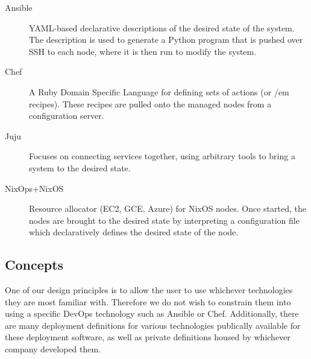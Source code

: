 \documentclass[9pt,twocolumn,twoside]{styles/osajnl}
\begin{document}
\begin{description}

\item[Ansible] YAML-based declarative descriptions of the desired
  state of the system. The description is used to generate a Python
  program that is pushed over SSH to each node, where it is then run
  to modify the system.

\item[Chef] A Ruby Domain Specific Language for defining sets of
  actions (or {/em recipes}). These recipes are pulled onto the
  managed nodes from a configuration server.

\item[Juju] Focuses on connecting services together, using arbitrary
  tools to bring a system to the desired state.

\item[NixOps+NixOS] Resource allocator (EC2, GCE, Azure) for NixOS
  nodes. Once started, the nodes are brought to the desired state by
  interpreting a configuration file which declaratively defines the
  desired state of the node.

\end{description}


\subsection{Concepts}

One of our design principles is to allow the user to use whichever
technologies they are most familiar with. Therefore we do not wish to
constrain them into using a specific DevOps technology such as Ansible
or Chef. Additionally, there are many deployment definitions for
various technologies publically available for these deployment
software, as well as private definitions housed by whichever company
developed them.
\end{document}
